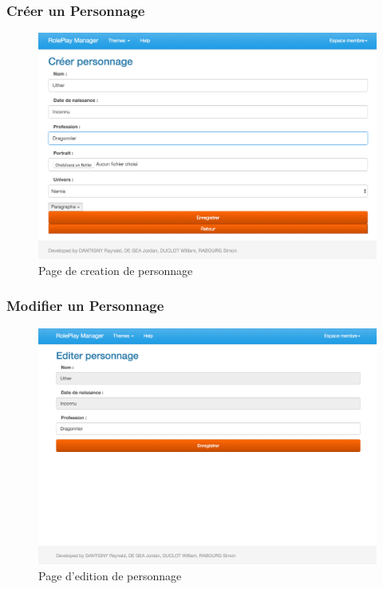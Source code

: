 \documentclass[a4paper,oneside,10pt]{article}
\begin{document}
\subsubsection{Créer un Personnage}
\label{MUCreerPersonnage}

\begin{figure}[H]
	\begin{center}
		\includegraphics[width=\textwidth]{images/manuel/creerpersonnage.png}  
		\caption{Page de creation de personnage}
	\end{center}
\end{figure}

\subsubsection{Modifier un Personnage}
\label{MUModifierPersonnage}

\begin{figure}[H]
	\begin{center}
		\includegraphics[width=\textwidth]{images/manuel/editerpersonnage.png}  
		\caption{Page d'edition de personnage}
	\end{center}
\end{figure}
\end{document}
